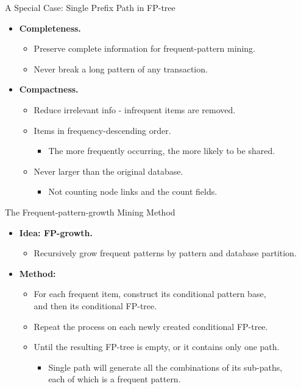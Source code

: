 \begin{frame}{A Special Case: Single Prefix Path in FP-tree}
	\centering
	\begin{itemize}
		\item \textbf{Completeness.}
		\begin{itemize}
			\item Preserve complete information for frequent-pattern mining.
			\item Never break a long pattern of any transaction.
		\end{itemize}
		\item \textbf{Compactness.}
		\begin{itemize}
			\item Reduce irrelevant info - infrequent items are removed.
			\item Items in frequency-descending order.
			\begin{itemize}
				\item The more frequently occurring, the more likely to be 
				shared.
			\end{itemize}
			\item Never larger than the original database.
			\begin{itemize}
				\item Not counting node links and the count fields.
			\end{itemize}
		\end{itemize}
	\end{itemize}
\end{frame}

\begin{frame}{The Frequent-pattern-growth Mining Method}
	\centering
	\begin{itemize}
		\item \textbf{Idea: FP-growth.}
		\begin{itemize}
			\item Recursively grow frequent patterns by pattern and database 
			partition.
		\end{itemize}
		\item \textbf{Method:}
		\begin{itemize}
			\item For each frequent item, construct its conditional pattern 
			base, \\
			and then its conditional FP-tree.
			\item Repeat the process on each newly created conditional FP-tree.
			\item Until the resulting FP-tree is empty, or it contains only one 
			path.
			\begin{itemize}
				\item Single path will generate all the combinations of its 
				sub-paths, \\
				each of which is a frequent pattern.
			\end{itemize}
		\end{itemize}
	\end{itemize}
\end{frame}

